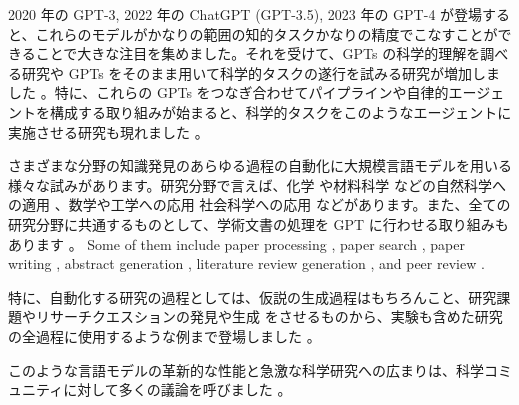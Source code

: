 2020 年の GPT-3, 2022 年の ChatGPT (GPT-3.5), 2023 年の GPT-4 が登場すると、これらのモデルがかなりの範囲の知的タスクかなりの精度でこなすことができることで大きな注目を集めました。それを受けて、GPTs の科学的理解を調べる研究や GPTs をそのまま用いて科学的タスクの遂行を試みる研究が増加しました \cite{bordt2023chatgpt,white2022large}。特に、これらの GPTs をつなぎ合わせてパイプラインや自律的エージェントを構成する取り組みが始まると、科学的タスクをこのようなエージェントに実施させる研究も現れました \cite{wang2023survey}。


さまざまな分野の知識発見のあらゆる過程の自動化に大規模言語モデルを用いる様々な試みがあります。研究分野で言えば、化学 \cite{bran2023chemcrow,jablonka202314,white2022large,hatakeyama2023prompt,jablonka202314,guo2023can} や材料科学 \cite{jablonka202314,jablonka202314,xie2023large,kang2023chatmof,merchant2023scaling} などの自然科学への適用 \cite{ai4science2023impact,bran2023chemcrow,white2022large,hatakeyama2023prompt,jablonka202314,guo2023can,boiko2023emergent,charness2023generation,qin2023gpt,zheng2023large,qian2023can,wysocka2023large,lee2023benefits,nori2023capabilities,wang2023large,singhal2023large,yang2022gatortron,deng2023learning,merchant2023scaling}、数学や工学への応用 \cite{wu2023empirical,pursnani2023performance,zheng2023can,zhang2023automl}
社会科学への応用 \cite{wang2023survey,bail2023can,ziems2023can,park2023generative,horton2023large} などがあります。また、全ての研究分野に共通するものとして、学術文書の処理を GPT に行わせる取り組みもあります \cite{alzaabi2023chatgpt}。 Some of them include paper processing \cite{elicit,scispace,van2023chatgpt}, paper search \cite{elicit,scispace}, paper writing \cite{transformer2022can}, abstract generation \cite{gao2023comparing}, literature review generation \cite{aydin2022openai}, and peer review \cite{wexin2023can,liu2023reviewergpt,robertson2023gpt4,hosseini2023fighting}. 

特に、自動化する研究の過程としては、仮説の生成過程はもちろんこと、研究課題やリサーチクエスションの発見や生成 \cite{oppenlaender2023mapping,lahat2023evaluating} をさせるものから、実験も含めた研究の全過程に使用するような例まで登場しました \cite{boiko2023emergent,charness2023generation,qin2023gpt}。

このような言語モデルの革新的な性能と急激な科学研究への広まりは、科学コミュニティに対して多くの議論を呼びました \cite{birhane2023science}。



